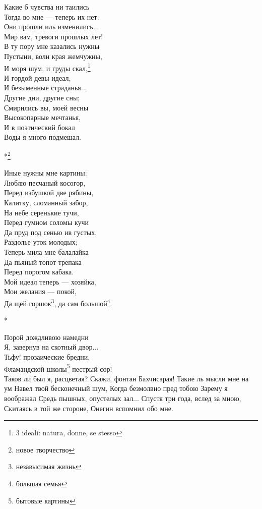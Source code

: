 Какие б чувства ни таились\\
Тогда во мне — теперь их нет:\\
Они прошли иль изменились...\\
Мир вам, тревоги прошлых лет!\\
В ту пору мне казались нужны\\
Пустыни, волн края жемчужны,\\
И моря шум, и груды скал,\footnote{3 ideali: natura, donne, se stesso}\\
И гордой девы идеал,\\
И безыменные страданья...\\
Другие дни, другие сны;\\
Смирились вы, моей весны\\
Высокопарные мечтанья,\\
И в поэтический бокал\\
Воды я много подмешал.

*\footnote{новое творчество}

Иные нужны мне картины:\\
Люблю песчаный косогор,\\
Перед избушкой две рябины,\\
Калитку, сломанный забор,\\
На небе серенькие тучи,\\
Перед гумном соломы кучи\\
Да пруд под сенью ив густых,\\
Раздолье уток молодых;\\
Теперь мила мне балалайка\\
Да пьяный топот трепака\\
Перед порогом кабака.\\
Мой идеал теперь — хозяйка,\\
Мои желания — покой,\\
Да щей горшок\footnote{незавысимая жизнь}, да сам большой\footnote{большая семья}.

*

Порой дождливою намедни\\
Я, завернув на скотный двор...\\
Тьфу! прозаические бредни,\\
Фламандской школы\footnote{бытовые картины} пестрый сор!\\
Таков ли был я, расцветая?
Скажи, фонтан Бахчисарая!
Такие ль мысли мне на ум
Навел твой бесконечный шум,
Когда безмолвно пред тобою
Зарему я воображал
Средь пышных, опустелых зал...
Спустя три года, вслед за мною,
Скитаясь в той же стороне,
Онегин вспомнил обо мне.

